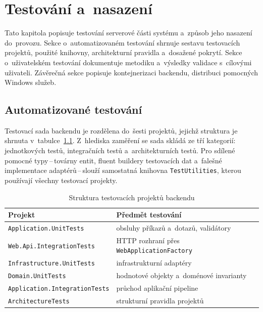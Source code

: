 \chapter{Testování a~nasazení}
\label{ch:testing-deployment}

Tato kapitola popisuje testování serverové části systému a~způsob jeho nasazení do~provozu.
Sekce o~automatizovaném testování shrnuje sestavu testovacích projektů, použité knihovny, architekturní pravidla a~dosažené pokrytí.
Sekce o~uživatelském testování dokumentuje metodiku a~výsledky validace s~cílovými uživateli.
Závěrečná sekce popisuje kontejnerizaci backendu, distribuci pomocných Windows služeb.

\section{Automatizované testování}
\label{sec:test-automated}

Testovací sada backendu je rozdělena do~šesti projektů, jejichž struktura je shrnuta v~tabulce~\ref{tab:test-projects}.
Z~hlediska zaměření se sada skládá ze tří kategorií: jednotkových testů, integračních testů a~architekturních testů.
Pro sdílené pomocné typy\,--\,továrny entit, fluent buildery testovacích dat a~falešné implementace adaptérů\,--\,slouží samostatná knihovna \texttt{TestUtilities}, kterou používají všechny testovací projekty.

\begin{table}[h]
\centering
\caption{Struktura testovacích projektů backendu}
\label{tab:test-projects}
\begin{tabular}{ll}
\toprule
Projekt & Předmět testování \\
\midrule
\texttt{Application.UnitTests}        & obsluhy příkazů a~dotazů, validátory \\
\texttt{Web.Api.IntegrationTests}     & HTTP rozhraní přes \texttt{WebApplicationFactory} \\
\texttt{Infrastructure.UnitTests}     & infrastrukturní adaptéry \\
\texttt{Domain.UnitTests}             & hodnotové objekty a~doménové invarianty \\
\texttt{Application.IntegrationTests} & průchod aplikační pipeline \\
\texttt{ArchitectureTests}            & strukturní pravidla projektů \\
\bottomrule
\end{tabular}
\end{table}


